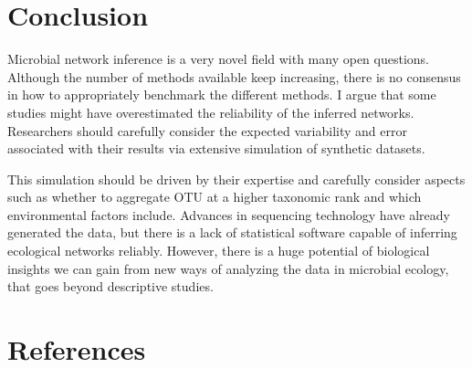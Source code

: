 \documentclass[
  a4paper,
]{article}
\begin{document}
\hypertarget{conclusion}{%
\section{Conclusion}\label{conclusion}}

Microbial network inference is a very novel field with many open
questions. Although the number of methods available keep increasing,
there is no consensus in how to appropriately benchmark the different
methods. I argue that some studies might have overestimated the
reliability of the inferred networks. Researchers should carefully
consider the expected variability and error associated with their
results via extensive simulation of synthetic datasets.

This simulation should be driven by their expertise and carefully
consider aspects such as whether to aggregate OTU at a higher taxonomic
rank and which environmental factors include. Advances in sequencing
technology have already generated the data, but there is a lack of
statistical software capable of inferring ecological networks reliably.
However, there is a huge potential of biological insights we can gain
from new ways of analyzing the data in microbial ecology, that goes
beyond descriptive studies.

\newpage

\hypertarget{references}{%
\section*{References}\label{references}}
\end{document}
